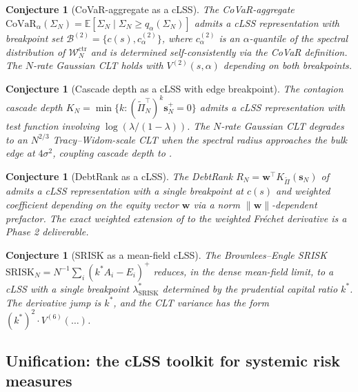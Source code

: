 \documentclass[11pt,a4paper]{article}
\newtheorem{conjecture}[theorem]{Conjecture}
\theoremstyle{definition}
\newcommand{\WN}{\mathcal{W}_N^{\mathrm{ctr}}}
\newcommand{\SigmaN}{\Sigma_N}
\newcommand{\Bcal}{\mathcal{B}}
\newcommand{\Kcal}{K_{\widetilde{\Pi}}}
\begin{document}
\begin{conjecture}[CoVaR-aggregate as a cLSS]
\label{conj:R2}
The CoVaR-aggregate
$\mathrm{CoVaR}_\alpha(\SigmaN) = \mathbb E[\SigmaN\mid\SigmaN\geq q_\alpha(\SigmaN)]$
admits a cLSS representation with breakpoint set
$\Bcal^{(2)} = \{c(s),c^{(2)}_\alpha\}$, where $c^{(2)}_\alpha$ is an
$\alpha$-quantile of the spectral distribution of $\WN$ and is determined
self-consistently via the CoVaR definition. The $N$-rate Gaussian CLT holds
with $V^{(2)}(s,\alpha)$ depending on both breakpoints.
\end{conjecture}

\begin{conjecture}[Cascade depth as a cLSS with edge breakpoint]
\label{conj:R3}
The contagion cascade depth $K_N = \min\{k:(\widetilde\Pi_N^\top)^k\mathbf s_N^+ = 0\}$
admits a cLSS representation with test function involving $\log(\lambda/(1-\lambda))$.
The $N$-rate Gaussian CLT degrades to an $N^{2/3}$ Tracy--Widom-scale CLT
when the spectral radius approaches the bulk edge at $4\sigma^2$, coupling
cascade depth to .
\end{conjecture}

\begin{conjecture}[DebtRank as a cLSS]
\label{conj:R5}
The DebtRank $R_N = \mathbf w^\top\Kcal(\mathbf s_N)$ of
\cite{BattistonEtAl2012} admits a cLSS representation with a single
breakpoint at $c(s)$ and weighted coefficient depending on the equity vector
$\mathbf w$ via a norm $\|\mathbf w\|$-dependent prefactor. The exact
weighted extension of  to the weighted Fr\'echet
derivative is a Phase 2 deliverable.
\end{conjecture}

\begin{conjecture}[SRISK as a mean-field cLSS]
\label{conj:R6}
The Brownlees--Engle SRISK \cite{BrownleesEngle2017}
$\mathrm{SRISK}_N = N^{-1}\sum_i(k^\ast A_i - E_i)^+$ reduces, in the dense
mean-field limit, to a cLSS with a single breakpoint $\lambda^\ast_{\mathrm{SRISK}}$
determined by the prudential capital ratio $k^\ast$. The derivative jump is
$k^\ast$, and the CLT variance has the form $(k^\ast)^2\cdot V^{(6)}(\ldots)$.
\end{conjecture}

\subsection{Unification: the cLSS toolkit for systemic risk measures}
\end{document}
